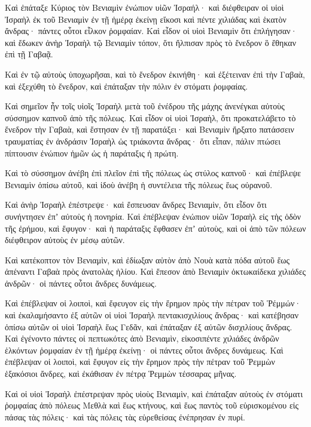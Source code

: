 {Καὶ ἐπάταξε Κύριος τὸν Βενιαμὶν ἐνώπιον υἱῶν Ἰσραήλ· καὶ διέφθειραν οἱ υἱοὶ Ἰσραὴλ ἐκ τοῦ Βενιαμὶν ἐν τῇ ἡμέρᾳ ἐκείνῃ εἴκοσι καὶ πέντε χιλιάδας καὶ ἑκατὸν ἄνδρας· πάντες οὗτοι εἷλκον ῥομφαίαν.
Καὶ εἶδον οἱ υἱοὶ Βενιαμὶν ὅτι ἐπλήγησαν· καὶ ἔδωκεν ἀνὴρ Ἰσραὴλ τῷ Βενιαμὶν τόπον, ὅτι ἤλπισαν πρὸς τὸ ἔνεδρον ὃ ἔθηκαν ἐπὶ τῇ Γαβαᾷ.
\par }{\PP {}Καὶ ἐν τῷ αὐτοὺς ὑποχωρῆσαι, καὶ τὸ ἔνεδρον ἐκινήθη· καὶ ἐξέτειναν ἐπὶ τὴν Γαβαὰ, καὶ ἐξεχύθη τὸ ἔνεδρον, καὶ ἐπάταξαν τὴν πόλιν ἐν στόματι ῥομφαίας.
\par }{\PP {}Καὶ σημεῖον ἦν τοῖς υἱοῖς Ἰσραὴλ μετὰ τοῦ ἐνέδρου τῆς μάχης ἀνενέγκαι αὐτοὺς σύσσημον καπνοῦ ἀπὸ τῆς πόλεως.
Καὶ εἶδον οἱ υἱοὶ Ἰσραὴλ, ὅτι προκατελάβετο τὸ ἔνεδρον τὴν Γαβαὰ, καὶ ἔστησαν ἐν τῇ παρατάξει· καὶ Βενιαμὶν ἤρξατο πατάσσειν τραυματίας ἐν ἀνδράσιν Ἰσραὴλ ὡς τριάκοντα ἄνδρας· ὅτι εἶπαν, πάλιν πτώσει πίπτουσιν ἐνώπιον ἡμῶν ὡς ἡ παράταξις ἡ πρώτη.
\par }{\PP {}Καὶ τὸ σύσσημον ἀνέβη ἐπὶ πλεῖον ἐπὶ τῆς πόλεως ὡς στύλος καπνοῦ· καὶ ἐπέβλεψε Βενιαμὶν ὀπίσω αὐτοῦ, καὶ ἰδοὺ ἀνέβη ἡ συντέλεια τῆς πόλεως ἕως οὐρανοῦ.
\par }{\PP {}Καὶ ἀνὴρ Ἰσραὴλ ἐπέστρεψε· καὶ ἔσπευσαν ἄνδρες Βενιαμὶν, ὅτι εἶδον ὅτι συνήντησεν ἐπʼ αὐτοὺς ἡ πονηρία.
Καὶ ἐπέβλεψαν ἐνώπιον υἱῶν Ἰσραὴλ εἰς τὴς ὁδὸν τῆς ἐρήμου, καὶ ἔφυγον· καὶ ἡ παράταξις ἔφθασεν ἐπʼ αὐτοὺς, καὶ οἱ ἀπὸ τῶν πόλεων διέφθειρον αὐτοὺς ἐν μέσῳ αὐτῶν.
\par }{\PP {}Καὶ κατέκοπτον τὸν Βενιαμὶν, καὶ ἐδίωξαν αὐτὸν ἀπὸ Νουὰ κατὰ πόδα αὐτοῦ ἕως ἀπέναντι Γαβαὰ πρὸς ἀνατολὰς ἡλίου.
Καὶ ἔπεσον ἀπὸ Βενιαμὶν ὀκτωκαίδεκα χιλιάδες ἀνδρῶν· οἱ πάντες οὗτοι ἄνδρες δυνάμεως.
\par }{\PP {}Καὶ ἐπέβλεψαν οἱ λοιποὶ, καὶ ἔφευγον εἰς τὴν ἔρημον πρὸς τὴν πέτραν τοῦ Ῥέμμών· καὶ ἐκαλαμήσαντο ἐξ αὐτῶν οἱ υἱοὶ Ἰσραὴλ πεντακισχιλίους ἄνδρας· καὶ κατέβησαν ὀπίσω αὐτῶν οἱ υἱοὶ Ἰσραὴλ ἕως Γεδᾶν, καὶ ἐπάταξαν ἐξ αὐτῶν δισχιλίους ἄνδρας.
Καὶ ἐγένοντο πάντες οἱ πεπτωκότες ἀπὸ Βενιαμὶν, εἰκοσιπέντε χιλιάδες ἀνδρῶν ἑλκόντων ῥομφαίαν ἐν τῇ ἡμέρᾳ ἐκείνῃ· οἱ πάντες οὗτοι ἄνδρες δυνάμεως.
Καὶ ἐπέβλεψαν οἱ λοιποὶ, καὶ ἔφυγον εἰς τὴν ἔρημον πρὸς τὴν πέτραν τοῦ Ῥεμμὼν ἑξακόσιοι ἄνδρες, καὶ ἐκάθισαν ἐν πέτρᾳ Ῥεμμὼν τέσσαρας μῆνας.
\par }{\PP {}Καὶ οἱ υἱοὶ Ἰσραὴλ ἐπέστρεψαν πρὸς υἱοὺς Βενιαμὶν, καὶ ἐπάταξαν αὐτοὺς ἐν στόματι ῥομφαίας ἀπὸ πόλεως Μεθλὰ καὶ ἕως κτήνους, καὶ ἕως παντὸς τοῦ εὑρισκομένου εἰς πάσας τὰς πόλεις· καὶ τὰς πόλεις τὰς εὑρεθείσας ἐνέπρησαν ἐν πυρί.

}
